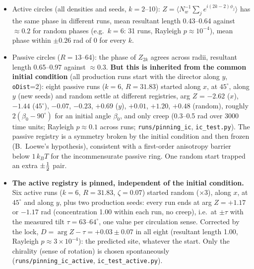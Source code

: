 \begin{itemize}
  \item Active circles (all densities and seeds, $k=2$--10): $Z=\langle N_w^{-1}\sum_je^{i(2k-2)\phi_j}\rangle$ has the same phase in different runs,
        mean resultant length 0.43--0.64 against $\approx0.2$ for random phases (e.g.\ $k=6$: 31 runs, Rayleigh $p\approx10^{-4}$), mean phase within
        $\pm0.26$ rad of 0 for every $k$.
  \item Passive circles ($R=13$--64): the phase of $Z_{2k}$ agrees across radii, resultant length 0.65--0.97 against $\approx0.3$. \textbf{But this is
        inherited from the common initial condition} (all production runs start with the director along $y$, \texttt{oDist}=2): eight passive runs
        ($k=6$, $R=31.83$) started along $x$, at $45^\circ$, along $y$ (new seeds) and random settle at different registries, arg $Z$ = $-2.62$ ($x$), $-1.44$
        ($45^\circ$), $-0.07$, $-0.23$, $+0.69$ ($y$), $+0.01$, $+1.20$, $+0.48$ (random), roughly $2(\beta_0-90^\circ)$ for an initial angle $\beta_0$, and only
        creep (0.3--0.5 rad over 3000 time units; Rayleigh $p\approx0.1$ across runs; \texttt{runs/pinning\_ic}, \texttt{ic\_test.py}). The passive registry is
        a symmetry broken by the initial condition and then frozen (B.~Loewe's hypothesis), consistent with a first-order anisotropy barrier below
        $1\,k_BT$ for the incommensurate passive ring. One random start trapped an extra $\pm\tfrac12$ pair.
  \item \textbf{The active registry is pinned, independent of the initial condition.} Six active runs ($k=6$, $R=31.83$, $\zeta=0.07$) started random
        ($\times3$), along $x$, at $45^\circ$ and along $y$, plus two production seeds: every run ends at arg $Z=+1.17$ or $-1.17$ rad (concentration 1.00 within
        each run, no creep), i.e.\ at $\pm\tau$ with the measured tilt $\tau=63$--$64^\circ$, one value per circulation sense. Corrected by the lock,
        $D=\arg Z-\tau=+0.03\pm0.07$ in all eight (resultant length 1.00, Rayleigh $p\approx3\times10^{-4}$): the predicted site, whatever the start. Only the
        chirality (sense of rotation) is chosen spontaneously (\texttt{runs/pinning\_ic\_active}, \texttt{ic\_test\_active.py}).
\end{itemize}

